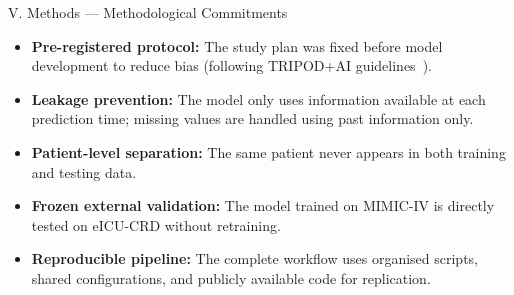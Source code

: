 \begin{frame}{V. Methods --- Methodological Commitments}
\begin{itemize}
  \item \textbf{Pre-registered protocol:} The study plan was fixed before
        model development to reduce bias (following TRIPOD+AI
        guidelines~\cite{collins2024tripodai}).
  \item \textbf{Leakage prevention:} The model only uses information
        available at each prediction time; missing values are handled using
        past information only.
  \item \textbf{Patient-level separation:} The same patient never appears in
        both training and testing data.
  \item \textbf{Frozen external validation:} The model trained on MIMIC-IV
        is directly tested on eICU-CRD without retraining.
  \item \textbf{Reproducible pipeline:} The complete workflow uses organised
        scripts, shared configurations, and publicly available code for
        replication.
\end{itemize}
\end{frame}
